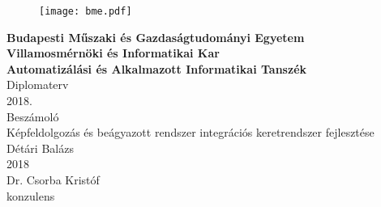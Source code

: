 \begin{titlepage}

\begin{figure}
\centering
\texttt{[image: bme.pdf]}
\end{figure}

\centering
\textbf{Budapesti Műszaki és Gazdaságtudományi Egyetem}\\
\textbf{Villamosmérnöki és Informatikai Kar}\\
\textbf{Automatizálási és Alkalmazott Informatikai Tanszék}\\
\vspace{30mm}
\Huge
Diplomaterv\\
2018.\\
\Large
Beszámoló\\
\vspace{30mm}
\Large
Képfeldolgozás és beágyazott rendszer integrációs keretrendszer fejlesztése\\
\vspace{10mm}
\Large
Détári Balázs\\
\vspace{10mm}
2018\\
\vspace{50mm}
\Large
\hfill Dr. Csorba Kristóf\\
\normalsize
\hfill konzulens

\end{titlepage}